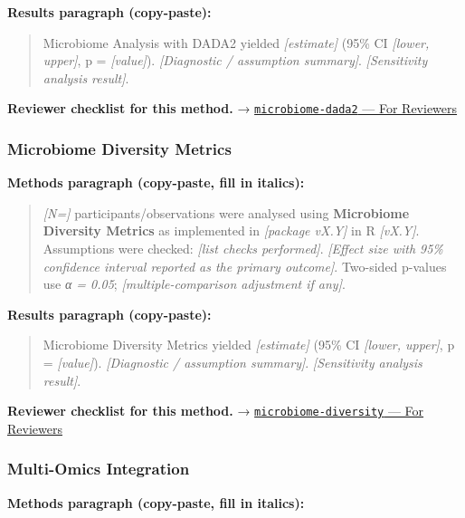 \documentclass[
]{article}
\begin{document}
\textbf{Results paragraph (copy-paste):}

\begin{quote}
Microbiome Analysis with DADA2 yielded \emph{{[}estimate{]}} (95\% CI
\emph{{[}lower, upper{]}}, p = \emph{{[}value{]}}). \emph{{[}Diagnostic
/ assumption summary{]}}. \emph{{[}Sensitivity analysis result{]}}.
\end{quote}

\textbf{Reviewer checklist for this method.} →
\href{../chapters/12-bioinformatics/microbiome-dada2.Rmd\#for-reviewers}{\texttt{microbiome-dada2}
--- For Reviewers}

\subsubsection{Microbiome Diversity
Metrics}\label{microbiome-diversity-metrics}

\textbf{Methods paragraph (copy-paste, fill in italics):}

\begin{quote}
\emph{{[}N={]}} participants/observations were analysed using
\textbf{Microbiome Diversity Metrics} as implemented in \emph{{[}package
vX.Y{]}} in R \emph{{[}vX.Y{]}}. Assumptions were checked: \emph{{[}list
checks performed{]}}. \emph{{[}Effect size with 95\% confidence interval
reported as the primary outcome{]}}. Two-sided p-values use \emph{α =
0.05}; \emph{{[}multiple-comparison adjustment if any{]}}.
\end{quote}

\textbf{Results paragraph (copy-paste):}

\begin{quote}
Microbiome Diversity Metrics yielded \emph{{[}estimate{]}} (95\% CI
\emph{{[}lower, upper{]}}, p = \emph{{[}value{]}}). \emph{{[}Diagnostic
/ assumption summary{]}}. \emph{{[}Sensitivity analysis result{]}}.
\end{quote}

\textbf{Reviewer checklist for this method.} →
\href{../chapters/12-bioinformatics/microbiome-diversity.Rmd\#for-reviewers}{\texttt{microbiome-diversity}
--- For Reviewers}

\subsubsection{Multi-Omics Integration}\label{multi-omics-integration}

\textbf{Methods paragraph (copy-paste, fill in italics):}
\end{document}
